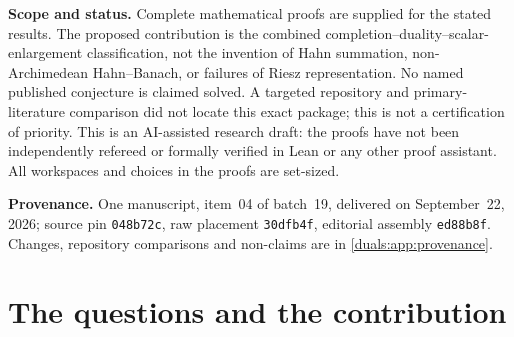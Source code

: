 \documentclass[11pt,letterpaper]{article}
\numberwithin{equation}{section}
\theoremstyle{definition}
\theoremstyle{remark}
\begin{document}
\begin{titlepage}
\begin{minipage}{.94\textwidth}
\begin{abstract}
For infinite-dimensional complex Hilbert $H$ and noncyclic $\Gamma$,
this produces three strictly nested duals: inner-product-represented, strong, and valuation-continuous.
The first gap is exactly the Hahn extension of the ordinary algebraic-dual
quotient $H^\#/H'$. All strong maps are bounded by a positive real Hahn
scalar, even when their coefficient maps are discontinuous in the
ordinary Hilbert norm. An explicit choice-based hyperplane has a strong
bounded projection but zero orthogonal complement, and the distance from
an exterior constant vector has no infimum in the scalar field.
 compares these results with the collection's
\emph{Infinite-Dimensional Hahn Spectral Theory}, whose Hahn--Hilbert
space is the one used here.
\end{abstract}
\end{minipage}
\vfill
\begin{minipage}{.94\textwidth}\small
\textbf{Scope and status.} Complete mathematical proofs are supplied for
the stated results. The proposed contribution is the combined
completion--duality--scalar-enlargement classification, not the invention
of Hahn summation, non-Archimedean Hahn--Banach, or failures of Riesz
representation. No named published conjecture is claimed solved. A
targeted repository and primary-literature comparison did not locate this
exact package; this is not a certification of priority. This is an
AI-assisted research draft: the proofs have not been independently
refereed or formally verified in Lean or any other proof assistant. All
workspaces and choices in the proofs are set-sized.

\textbf{Provenance.} One manuscript, item~04 of batch~19, delivered on
September~22, 2026; source pin \texttt{048b72c}, raw placement \texttt{30dfb4f},
editorial assembly \texttt{ed88b8f}. Changes, repository comparisons and
non-claims are in \cref{duals:app:provenance}.
\end{minipage}
\end{titlepage}
\hypersetup{pageanchor=true}
\tableofcontents\clearpage
{}

\section{The questions and the contribution}\label{duals:sec:intro}
\end{document}
